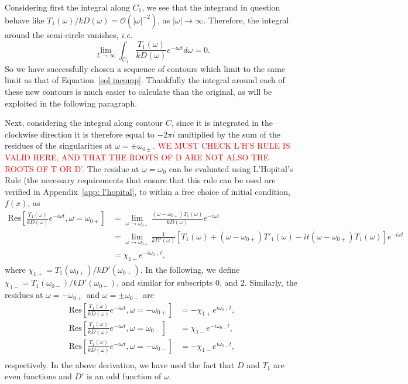 \documentclass{aastex61}
\begin{document}
Considering first the integral along $C_1$, we see that the integrand in question behave like $T_1(\omega)/kD(\omega) = \mathcal{O}(|\omega|^{-2})$, as $|\omega| \to \infty$. Therefore, the integral around the semi-circle vanishes, \textit{i.e.}
\begin{equation}
\lim_{L \to \infty} \int_{C_1} \frac{T_1(\omega)}{kD(\omega)} e^{-i\omega t} d\omega = 0.
\end{equation}
So we have successfully chosen a sequence of contours which limit to the same limit as that of Equation~\eqref{sol incomp}. Thankfully the integral around each of these new contours is much easier to calculate than the original, as will be exploited in the following paragraph.

Next, considering the integral along contour $C$, since it is integrated in the clockwise direction it is therefore equal to $-2\pi i$ multiplied by the sum of the residues of the singularities at $\omega = \pm \omega_{0\pm}$. \textcolor{red}{WE MUST CHECK L'H'S RULE IS VALID HERE, AND THAT THE ROOTS OF D ARE NOT ALSO THE ROOTS OF T OR D'.} The residue at $\omega = \omega_0$ can be evaluated using L'Hopital's Rule (the necessary requirements that ensure that this rule can be used are verified in Appendix~\ref{app: l'hopital}, to within a free choice of initial condition, $f(x)$, as
\begin{align}
\mathrm{Res}\left[\frac{T_1(\omega)}{kD(\omega)}e^{-i\omega t}, \omega = \omega_{0+} \right] &= 
\lim_{\omega \to \omega_{0+}} \frac{(\omega - \omega_{0+})T_1(\omega)}{kD(\omega)} e^{-i\omega t} \\ 
&= \lim_{\omega \to \omega_{0+}} \frac{1}{kD'(\omega)} [T_1(\omega) + (\omega - \omega_{0+})T'_1(\omega) - it(\omega - \omega_{0+})T_1(\omega)]e^{-i\omega t} \\
&= \chi_{1+} e^{-i\omega_{0+} t},
\end{align}
where $\chi_{1+} = T_1(\omega_{0+}) / kD'(\omega_{0+})$. In the following, we define $\chi_{1-} = T_1(\omega_{0-}) / kD'(\omega_{0-})$, and similar for subscripts $0$, and $2$. Similarly, the residues at $\omega = -\omega_{0+}$ and $\omega = \pm\omega_{0-}$ are
\begin{align}
\mathrm{Res}\left[\frac{T_1(\omega)}{kD(\omega)}e^{-i\omega t}, \omega = -\omega_{0+} \right] &= -\chi_{1+} e^{i\omega_{0+} t}, \\
\mathrm{Res}\left[\frac{T_1(\omega)}{kD(\omega)}e^{-i\omega t}, \omega = \omega_{0-} \right] &= \chi_{1-} e^{-i\omega_{0-} t}, \\
\mathrm{Res}\left[\frac{T_1(\omega)}{kD(\omega)}e^{-i\omega t}, \omega = -\omega_{0-} \right] &= -\chi_{1-} e^{i\omega_{0-} t}, \\
\end{align}
respectively. In the above derivation, we have used the fact that $D$ and $T_1$ are even functions and $D'$ is an odd function of $\omega$.
\end{document}
